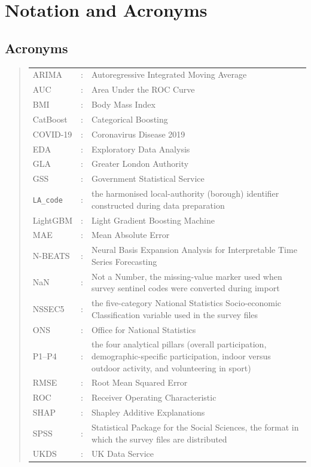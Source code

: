 \documentclass[ %
                    author={Ashrey Ashrey, Sanya Kapoor, Trisha Sharma, Yash Bhooshan Pandloskar},
                supervisor={Dr. Dalila O’Grady},
                    degree={MSc},
                     title={Using machine learning to forecast physical activity participation, volunteering and activity patterns in London},
                  subtitle={},
                      type={},
                      year={2021}]{dissertation}
\begin{document}

\chapter*{Notation and Acronyms}

\section*{Acronyms}

\begin{quote}
\noindent
\begin{tabular}{l c >{\raggedright\arraybackslash}p{}}
ARIMA    & : & Autoregressive Integrated Moving Average \\
AUC      & : & Area Under the ROC Curve \\
BMI      & : & Body Mass Index \\
CatBoost & : & Categorical Boosting \\
COVID-19 & : & Coronavirus Disease 2019 \\
EDA      & : & Exploratory Data Analysis \\
GLA      & : & Greater London Authority \\
GSS      & : & Government Statistical Service \\
\texttt{LA\_code} & : & the harmonised local-authority (borough) identifier constructed during data preparation \\
LightGBM & : & Light Gradient Boosting Machine \\
MAE      & : & Mean Absolute Error \\
N-BEATS  & : & Neural Basis Expansion Analysis for Interpretable Time Series Forecasting \\
NaN      & : & Not a Number, the missing-value marker used when survey sentinel codes were converted during import \\
NSSEC5   & : & the five-category National Statistics Socio-economic Classification variable used in the survey files \\
ONS      & : & Office for National Statistics \\
P1--P4   & : & the four analytical pillars (overall participation, demographic-specific participation, indoor versus outdoor activity, and volunteering in sport) \\
RMSE     & : & Root Mean Squared Error \\
ROC      & : & Receiver Operating Characteristic \\
SHAP     & : & Shapley Additive Explanations \\
SPSS     & : & Statistical Package for the Social Sciences, the format in which the survey files are distributed \\
UKDS     & : & UK Data Service \\
\end{tabular}
\end{quote}
\end{document}
